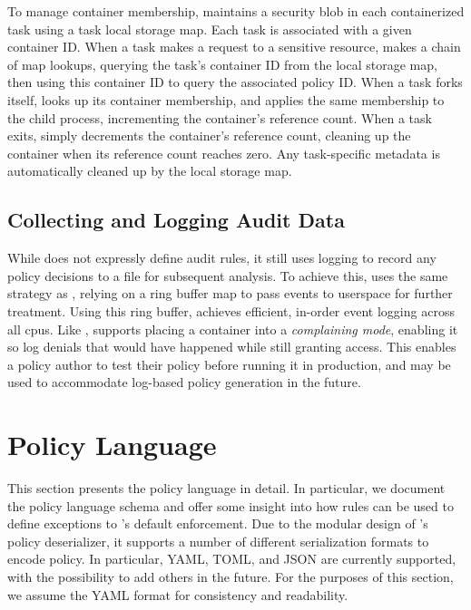 To manage container membership, \bpfcontain{} maintains a security blob in each
containerized task using a task local storage map. Each task is associated with a given
container ID. When a task makes a request to a sensitive resource, \bpfcontain{} makes
a chain of map lookups, querying the task's container ID from the local storage map, then
using this container ID to query the associated policy ID. When a task forks itself,
\bpfcontain{} looks up its container membership, and applies the same membership to the
child process, incrementing the container's reference count. When a task exits,
\bpfcontain{} simply decrements the container's reference count, cleaning up the container
when its reference count reaches zero. Any task-specific metadata is automatically cleaned
up by the local storage map.

\subsection{Collecting and Logging Audit Data}%
\label{ss:bpfcontain-audit}

While \bpfcontain{} does not expressly define audit rules, it still uses logging to record
any policy decisions to a file for subsequent analysis. To achieve this, \bpfcontain{}
uses the same strategy as \bpfbox{}, relying on a ring buffer map to pass events to
userspace for further treatment. Using this ring buffer, \bpfcontain{} achieves efficient,
in-order event logging across all \glspl{cpu}. Like \bpfbox{}, \bpfcontain{} supports
placing a container into a \textit{complaining mode}, enabling it so log denials that
would have happened while still granting access. This enables a policy author to test
their policy before running it in production, and may be used to accommodate log-based
policy generation in the future.



\section{\bpfcontain{} Policy Language}%
\label{s:bpfcontain-policy}

This section presents the \bpfcontain{} policy language in detail. In particular, we
document the policy language schema and offer some insight into how rules can be used to
define exceptions to \bpfcontain{}'s default enforcement. Due to the modular design of
\bpfcontain{}'s policy deserializer, it supports a number of different serialization
formats to encode policy. In particular, YAML, TOML, and JSON are currently supported,
with the possibility to add others in the future. For the purposes of this section, we
assume the YAML format for consistency and readability.

